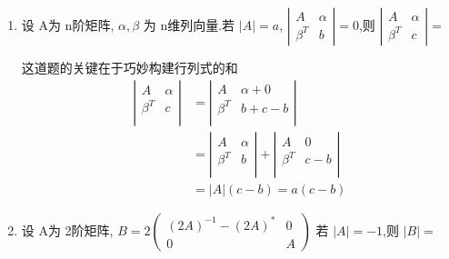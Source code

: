 \documentclass[12pt, a4paper, oneside, UTF8]{ctexbook}
\begin{document}
\begin{enumerate}[label=\arabic*.,start=7]
    \item 设 A为 n阶矩阵, $\alpha,\beta$ 为 n维列向量.若 $|A|=a$,
    $\left|\begin{array}{ll}A & \alpha \\ \beta^{T} & b\end{array}\right|=0$,则
    $\left|\begin{array}{ll}A & \alpha \\ \beta^{T} & c\end{array}\right|=$ \underline{\hspace{3cm}}
    
    \begin{solution}
    这道题的关键在于巧妙构建行列式的和
    \begin{align*}
        \left|\begin{array}{rr}
            A & \alpha \\
            \beta^{T} & c\\
        \end{array} 
        \right| 
        &= \left|\begin{array}{rr}
            A & \alpha + 0 \\
            \beta^{T} & b + c -b\\
        \end{array}\right|  \\
        &=\left|\begin{array}{rr}
            A & \alpha \\
            \beta^{T} & b\\
        \end{array}\right| + 
        \left|\begin{array}{rr}
            A & 0 \\
            \beta^{T} & c-b\\
        \end{array}\right| \\
        &=\left|A\right|(c-b) = a(c-b)
    \end{align*}
    \end{solution}
    
    \item 设 A为 2阶矩阵, 
    $B=2\left(
    \begin{array}{ll}
        (2A)^{-1}-(2A)^* & 0 \\
        0 & A
    \end{array}\right)
    $
    若 $|A|=-1$,则 $|B|=$ \underline{\hspace{3cm}}
    

\end{enumerate}
\end{document}
